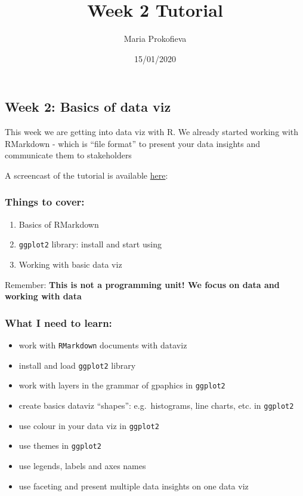 \documentclass[
]{article}
\title{Week 2 Tutorial}
\author{Maria Prokofieva}
\date{15/01/2020}
\providecommand{\tightlist}{%
  \setlength{\itemsep}{0pt}\setlength{\parskip}{0pt}}
\begin{document}
\maketitle

\hypertarget{week-2-basics-of-data-viz}{%
\subsection{Week 2: Basics of data
viz}\label{week-2-basics-of-data-viz}}

This week we are getting into data viz with R. We already started
working with RMarkdown - which is ``file format'' to present your data
insights and communicate them to stakeholders

A screencast of the tutorial is available
\href{https://www.youtube.com/channel/UCTpTqzAm8DCANz7ifhRI-sA?disable_polymer=true}{here}:

\hypertarget{things-to-cover}{%
\subsubsection{Things to cover:}\label{things-to-cover}}

\begin{enumerate}
\def\labelenumi{\arabic{enumi}.}
\tightlist
\item
  Basics of RMarkdown
\item
  \texttt{ggplot2} library: install and start using
\item
  Working with basic data viz
\end{enumerate}

Remember: \textbf{This is not a programming unit! We focus on data and
working with data}

\hypertarget{what-i-need-to-learn}{%
\subsubsection{What I need to learn:}\label{what-i-need-to-learn}}

\begin{itemize}
\tightlist
\item
  work with \texttt{RMarkdown} documents with dataviz
\item
  install and load \texttt{ggplot2} library
\item
  work with layers in the grammar of gpaphics in \texttt{ggplot2}
\item
  create basics dataviz ``shapes'': e.g.~histograms, line charts, etc.
  in \texttt{ggplot2}
\item
  use colour in your data viz in \texttt{ggplot2}
\item
  use themes in \texttt{ggplot2}
\item
  use legends, labels and axes names
\item
  use faceting and present multiple data insights on one data viz
\end{itemize}
\end{document}
